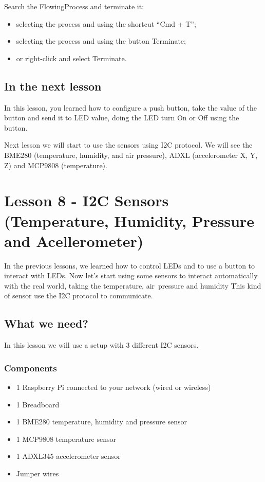 \documentclass[10pt,twoside,english]{_support/latex/sbabook/sbabook}
\begin{document}
Search the FlowingProcess and terminate it:

\begin{itemize}
\item selecting the process and using the shortcut “Cmd + T”;
\item selecting the process and using the button Terminate;
\item or right-click and select Terminate.
\end{itemize}
\section{In the next lesson}
In this lesson, you learned how to configure a push button, take the value of the button and send it to LED value, doing the LED turn On or Off using the button.

Next lesson we will start to use the sensors using I2C protocol. We will see the BME280 (temperature, humidity, and air pressure), ADXL (accelerometer X, Y, Z) and MCP9808 (temperature).
\chapter{Lesson 8 - I2C Sensors (Temperature, Humidity, Pressure and Acellerometer)}
In the previous lessons, we learned how to control LEDs and to use a button to interact with LEDs. Now let's start using some sensors to interact automatically with the real world, taking the temperature, air pressure and humidity This kind of sensor use the I2C protocol to communicate.
\section{What we need?}
In this lesson we will use a setup with 3 different I2C sensors.
\subsection{Components}
\begin{itemize}
\item 1 Raspberry Pi connected to your network (wired or wireless)
\item 1 Breadboard
\item 1 BME280 temperature, humidity and pressure sensor
\item 1 MCP9808 temperature sensor
\item 1 ADXL345 accelerometer sensor
\item Jumper wires
\end{itemize}
\end{document}
